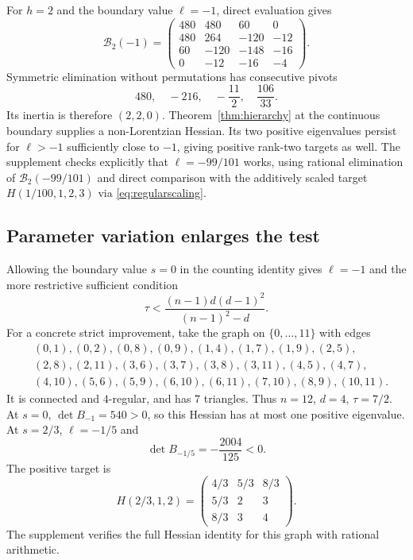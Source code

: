 \documentclass[11pt]{article}
\theoremstyle{remark}
\begin{document}
For $h=2$ and the boundary value $\ell=-1$, direct evaluation gives
\[
 \mathcal B_2(-1)=
 \begin{pmatrix}
 480&480&60&0\\480&264&-120&-12\\
 60&-120&-148&-16\\0&-12&-16&-4
 \end{pmatrix}.
\]
Symmetric elimination without permutations has consecutive pivots
\[
 480,\quad -216,\quad -\frac{11}{2},\quad \frac{106}{33}.
\]
Its inertia is therefore $(2,2,0)$. Theorem~\ref{thm:hierarchy}
at the continuous boundary supplies a non-Lorentzian Hessian.
Its two positive eigenvalues persist for $\ell>-1$ sufficiently
close to $-1$, giving positive rank-two targets as well.
The supplement checks explicitly that $\ell=-99/101$ works, using
rational elimination of $\mathcal B_2(-99/101)$ and direct
comparison with the additively scaled target $H(1/100,1,2,3)$
via \eqref{eq:regularscaling}.

\subsection{Parameter variation enlarges the test}
Allowing the boundary value $s=0$ in the counting identity gives
$\ell=-1$ and the more restrictive sufficient condition
\begin{equation}
 \tau<\frac{(n-1)d(d-1)^2}{(n-1)^2-d}.               \label{eq:old}
\end{equation}
For a concrete strict improvement, take the graph on
$\{0,\ldots,11\}$ with edges
\[
\begin{split}
 &(0,1),(0,2),(0,8),(0,9),(1,4),(1,7),(1,9),(2,5),\\
 &(2,8),(2,11),(3,6),(3,7),(3,8),(3,11),(4,5),(4,7),\\
 &(4,10),(5,6),(5,9),(6,10),(6,11),(7,10),(8,9),(10,11).
\end{split}
\]
It is connected and $4$-regular, and has $7$ triangles.
Thus $n=12$, $d=4$, $\tau=7/2$.
At $s=0$, $\det B_{-1}=540>0$, so this Hessian has at most one
positive eigenvalue. At $s=2/3$, $\ell=-1/5$ and
\[
 \det B_{-1/5}=-\frac{2004}{125}<0.
\]
The positive target is
\[
 H(2/3,1,2)=
 \begin{pmatrix}4/3&5/3&8/3\\5/3&2&3\\8/3&3&4\end{pmatrix}.
\]
The supplement verifies the full Hessian identity for this graph
with rational arithmetic.
\end{document}
